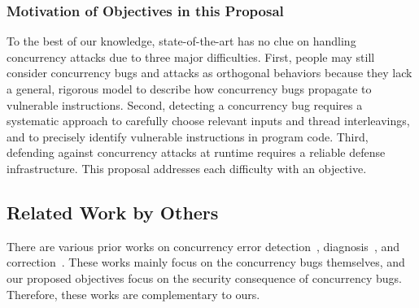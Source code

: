 \vspace{-.15in}\subsubsection{Motivation of Objectives in this Proposal} 
\label{sec:out-study}\vspace{-.075in}

To the best of our knowledge, state-of-the-art has no clue on handling
concurrency attacks due to three major difficulties.  First, 
people may still consider concurrency bugs and attacks as orthogonal 
behaviors because they lack a general, rigorous model to describe how 
concurrency bugs propagate to vulnerable instructions. Second, detecting a 
concurrency bug requires a systematic approach to carefully choose relevant 
inputs and thread interleavings, and to precisely identify vulnerable 
instructions in program code. Third, defending against concurrency attacks at 
runtime requires a reliable defense infrastructure. This proposal addresses 
each difficulty with an objective.





\vspace{-.15in}\subsection{Related Work by Others} 
\label{sec:others-work}\vspace{-.075in}

 There are various prior works on concurrency error 
detection~\cite{yu:racetrack:sosp,savage:eraser,racerx:sosp03,lu:muvi:sosp,
avio:asplos06,conmem:asplos10}, diagnosis~\cite{racefuzzer:pldi08,
ctrigger:asplos09,atomfuzzer:fse08}, 
and correction~\cite{dimmunix:osdi08,gadara:osdi08,wu:loom:osdi10,cfix:osdi12}. 
These works mainly focus on the concurrency bugs themselves, and our
proposed objectives focus on the security consequence of concurrency 
bugs. Therefore, these works are complementary to ours.

